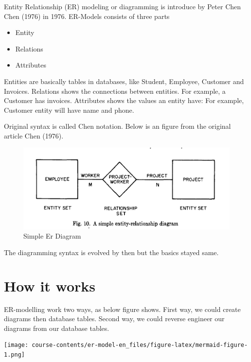 \documentclass[
  letterpaper,
  DIV=11,
  numbers=noendperiod]{scrreprt}
\providecommand{\tightlist}{%
  \setlength{\itemsep}{0pt}\setlength{\parskip}{0pt}}\usepackage{longtable,booktabs,array}
\begin{document}
Entity Relationship (ER) modeling or diagramming is introduce by Peter
Chen Chen (1976) in 1976. ER-Models consists of three parts

\begin{itemize}
\tightlist
\item
  Entity
\item
  Relations
\item
  Attributes
\end{itemize}

Entities are basically tables in databases, like Student, Employee,
Customer and Invoices. Relations shows the connections between entities.
For example, a Customer has invoices. Attributes shows the values an
entity have: For example, Customer entity will have name and phone.

Original syntax is called Chen notation. Below is an figure from the
original article Chen (1976).

\begin{figure}[H]

{\centering \includegraphics[width=0.8\linewidth,height=\textheight,keepaspectratio]{course-contents/images/Chen-1976-Figure-10-simple-er-diagram.png}

}

\caption{Simple Er Diagram}

\end{figure}%

The diagramming syntax is evolved by then but the basics stayed same.

\section{How it works}\label{how-it-works}

ER-modelling work two ways, as below figure shows. First way, we could
create diagrams then database tables. Second way, we could reverse
engineer our diagrams from our database tables.

\texttt{[image: course-contents/er-model-en\_files/figure-latex/mermaid-figure-1.png]}
\end{document}
